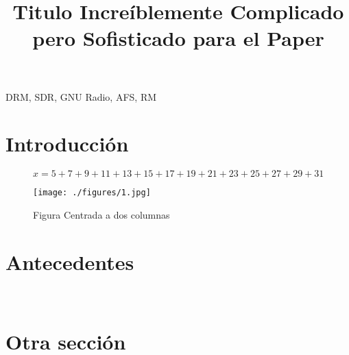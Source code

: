 \documentclass[conference]{IEEEtran}
\begin{document}
\title{ Titulo Increíblemente Complicado pero Sofisticado para el Paper
}

\author{
}

\maketitle


\begin{abstract}
    \blindtext
\end{abstract}


\begin{IEEEkeywords}

DRM, SDR, GNU Radio, AFS, RM

\end{IEEEkeywords}

\section{Introducción}

\blindtext
\Blindtext

\begin{figure*}[!htbp]
    \normalsize
    \begin{equation}
    \label{eqn_1}
    x = 5 + 7 + 9 + 11 + 13 + 15 + 17 + 19 + 21 + 23 + 25 + 27 + 29 + 31
    \end{equation}
\end{figure*}

\begin{figure*}[!htbp]
    \normalsize
    \centering
    \texttt{[image: ./figures/1.jpg]}
    \caption{Figura Centrada a dos columnas}%
    \label{fig:name}
\end{figure*}


\section{Antecedentes}

\blindtext
~\cite{1459187} 
\Blindtext

\section{Otra sección}%
\label{sec:otra_sección}

\blindtext
\Blindtext



\end{document}
